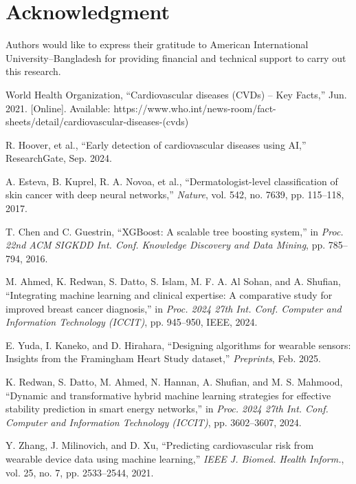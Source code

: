 \documentclass[conference]{IEEEtran}
\begin{document}
\section{Acknowledgment}
Authors would like to express their gratitude to American International University–Bangladesh for providing financial and technical support to carry out this research.










\begin{thebibliography}{00}

 World Health Organization, ``Cardiovascular diseases (CVDs) – Key Facts,'' Jun. 2021. [Online]. Available: https://www.who.int/news-room/fact-sheets/detail/cardiovascular-diseases-(cvds)

 R. Hoover, et al., ``Early detection of cardiovascular diseases using AI,'' ResearchGate, Sep. 2024.

 A. Esteva, B. Kuprel, R. A. Novoa, et al., ``Dermatologist-level classification of skin cancer with deep neural networks,'' \emph{Nature}, vol. 542, no. 7639, pp. 115--118, 2017.

 T. Chen and C. Guestrin, ``XGBoost: A scalable tree boosting system,'' in \emph{Proc. 22nd ACM SIGKDD Int. Conf. Knowledge Discovery and Data Mining}, pp. 785--794, 2016.

 M. Ahmed, K. Redwan, S. Datto, S. Islam, M. F. A. Al Sohan, and A. Shufian, ``Integrating machine learning and clinical expertise: A comparative study for improved breast cancer diagnosis,'' in \emph{Proc. 2024 27th Int. Conf. Computer and Information Technology (ICCIT)}, pp. 945--950, IEEE, 2024.

 E. Yuda, I. Kaneko, and D. Hirahara, ``Designing algorithms for wearable sensors: Insights from the Framingham Heart Study dataset,'' \emph{Preprints}, Feb. 2025.

 K. Redwan, S. Datto, M. Ahmed, N. Hannan, A. Shufian, and M. S. Mahmood, ``Dynamic and transformative hybrid machine learning strategies for effective stability prediction in smart energy networks,'' in \emph{Proc. 2024 27th Int. Conf. Computer and Information Technology (ICCIT)}, pp. 3602--3607, 2024.

 Y. Zhang, J. Milinovich, and D. Xu, ``Predicting cardiovascular risk from wearable device data using machine learning,'' \emph{IEEE J. Biomed. Health Inform.}, vol. 25, no. 7, pp. 2533--2544, 2021.


\end{thebibliography}
\end{document}
